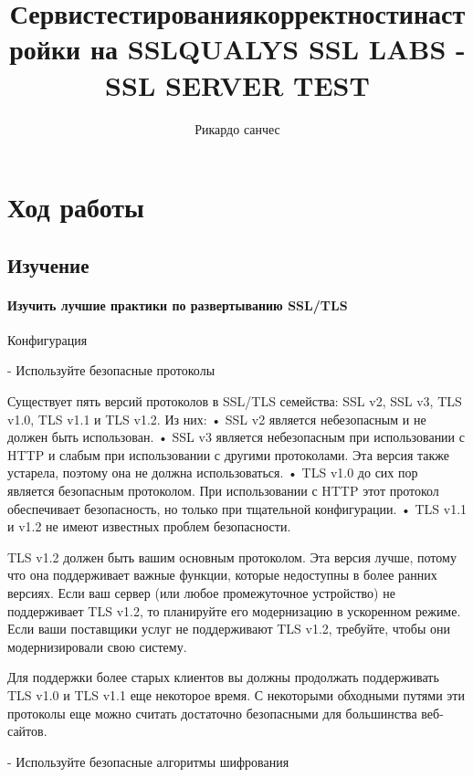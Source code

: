 \documentclass[10pt,a4paper]{article}
\author{Рикардо санчес}
\title{Сервистестированиякорректностинастройки на SSLQUALYS SSL LABS - SSL SERVER TEST}
\begin{document}
\maketitle

\section{Ход работы}
\subsection{Изучение}

\paragraph{ Изучить лучшие практики по развертыванию SSL/TLS}

 Конфигурация

- Используйте безопасные протоколы

Существует пять версий протоколов в SSL/TLS семейства: SSL v2, SSL v3, TLS v1.0, TLS v1.1 и TLS v1.2. Из них:
• SSL v2 является небезопасным и не должен быть использован. 
• SSL v3 является небезопасным при использовании с HTTP и слабым при использовании с другими протоколами. Эта версия также устарела, поэтому она не должна использоваться.
• TLS v1.0 до сих пор является безопасным протоколом. При использовании с HTTP этот протокол обеспечивает безопасность, но только при тщательной конфигурации.
• TLS v1.1 и v1.2 не имеют известных проблем безопасности.

TLS v1.2 должен быть вашим основным протоколом. Эта версия лучше, потому что она поддерживает важные функции, которые недоступны в более ранних версиях. Если ваш сервер (или любое промежуточное устройство) не поддерживает TLS v1.2, то планируйте его модернизацию в ускоренном режиме. Если ваши поставщики услуг не поддерживают TLS v1.2, требуйте, чтобы они модернизировали свою систему.

Для поддержки более старых клиентов вы должны продолжать поддерживать TLS v1.0 и TLS v1.1 еще некоторое время. С некоторыми обходными путями эти протоколы еще можно считать достаточно безопасными для большинства веб-сайтов.

- Используйте безопасные алгоритмы шифрования
\end{document}
